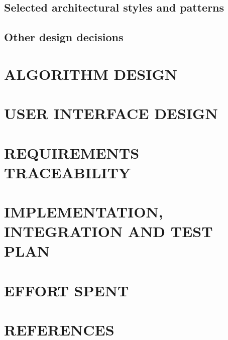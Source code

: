 \documentclass[11pt]{report}
\begin{document}
		\section{Selected architectural styles and patterns}
		\label{sect:Selected architectural styles and patterns}
		
		\section{Other design decisions}
		\label{sect:Other design decisions}
			
	\chapter{ALGORITHM DESIGN}
	\label{ch:ALGORITHM DESIGN}
			
	\chapter{USER INTERFACE DESIGN}
	\label{ch:USER INTERFACE DESIGN}
	
	\chapter{REQUIREMENTS TRACEABILITY}
	\label{ch:REQUIREMENTS TRACEABILITY}
			
	\chapter{IMPLEMENTATION, INTEGRATION AND TEST PLAN}
	\label{ch:IMPLEMENTATION, INTEGRATION AND TEST PLAN}
			
	\chapter{EFFORT SPENT}
	\label{ch:EFFORT SPENT}
	\chapter{REFERENCES}
	\label{ch:REFERENCES}
\end{document}
